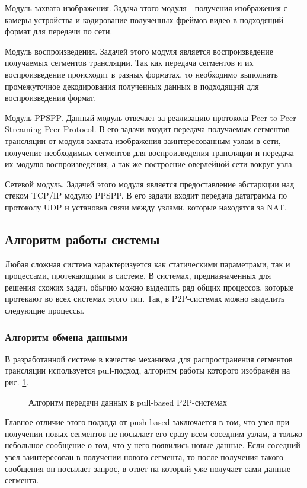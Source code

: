 			Модуль захвата изображения. Задача этого модуля - получения изображения с камеры устройства и
			кодирование полученных фреймов видео в подходящий формат для передачи по сети.

			Модуль воспроизведения. Задачей этого модуля является воспроизведение получаемых сегментов
			трансляции. Так как передача сегментов и их воспроизведение происходит в разных форматах, то необходимо
			выполнять промежуточное декодирования полученных данных в подходящий для воспроизведения формат.

			Модуль PPSPP. Данный модуль отвечает за реализацию протокола Peer-to-Peer Streaming Peer Protocol.
			В его задачи входит передача получаемых сегментов трансляции от модуля захвата изображения заинтересованным
			узлам в сети, получение необходимых сегментов для воспроизведения трансляции и передача их модулю
			воспроизведения, а так же построение оверлейной сети вокруг узла.

			Сетевой модуль. Задачей этого модуля является предоставление абстаркции над стеком TCP/IP модулю
			PPSPP. В его задачи входит передача датаграмма по протоколу UDP и установка связи между узлами, которые
			находятся за NAT.

	\subsection{Алгоритм работы системы}
		Любая сложная система характеризуется как статическими параметрами, так и процессами, протекающими в системе.
		В системах, предназначенных для решения схожих задач, обычно можно выделить ряд общих процессов, которые
		протекают во всех системах этого тип. Так, в P2P-системах можно выделить следующие процессы.

		\subsubsection{Алгоритм обмена данными}
		В разработанной системе в качестве механизма для распространения сегментов трансляции используется pull-подход,
		алгоритм работы которого изображён на рис. \ref{img:pull-based-data-flow}.

		\begin{figure}[H]
			\caption{Алгоритм передачи данных в pull-based P2P-системах}
			\label{img:pull-based-data-flow}
		\end{figure}

		Главное отличие этого подхода от push-based заключается в том, что узел при получении новых сегментов не
		посылает его сразу всем соседним узлам, а только небольшое сообщение о том, что у него появились новые данные.
		Если соседний узел заинтересован в получении нового сегмента, то после получения такого сообщения он посылает
		запрос, в ответ на который уже получает сами данные сегмента.

